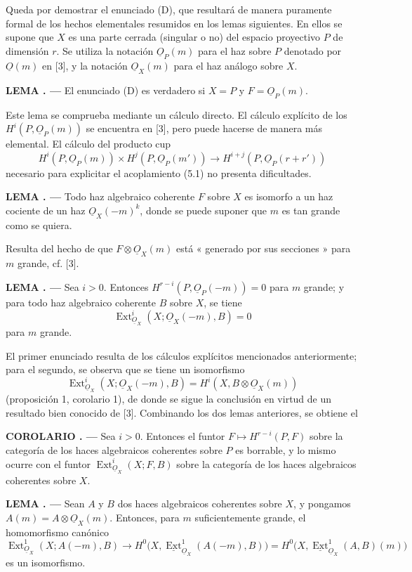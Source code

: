 \documentclass[11pt,twoside,openany]{book}
\numberwithin{equation}{section}
\newcommand{\src}[1]{%
  \phantomsection\hypertarget{src:#1}{}%
  \marginpar{\raggedleft\footnotesize\sffamily #1}%
}
\newcommand{\Osh}{\underline{O}}
\newcommand{\Extsh}{\underline{\operatorname{Ext}}}
\theoremstyle{plain}
\theoremstyle{definition}
\theoremstyle{remark}
\newcommand{\result}[2]{%
  \par\medskip\noindent\textbf{#1%
  \if\relax\detokenize{#2}\relax\else\space#2\fi. ---}\enspace
}
\newcommand{\FgaUnitKey}{frontmatter}
\renewcommand{\src}[1]{%
  \phantomsection\hypertarget{src:\FgaUnitKey:#1}{}%
  \marginpar{\raggedleft\footnotesize\sffamily #1}%
}
\theoremstyle{plain}
\theoremstyle{definition}
\theoremstyle{remark}
\begin{document}
Queda por demostrar el enunciado (D), que resultará de manera puramente formal de los hechos
elementales resumidos en los lemas siguientes. En ellos se supone que $X$ es una
parte cerrada (singular o no) del espacio proyectivo $P$ de dimensión $r$.
Se utiliza la notación $\Osh_P(m)$ para el haz sobre $P$ denotado por $\Osh(m)$ en
[3], y la notación $\Osh_X(m)$ para el haz análogo sobre $X$.

\result{LEMA}{2} El enunciado (D) es verdadero si $X=P$ y $F=\Osh_P(m)$.

Este lema se comprueba mediante un cálculo directo. El cálculo explícito de los
$H^{i}(P,\Osh_P(m))$ se encuentra en [3], pero puede hacerse de manera más
elemental. El cálculo del producto cup
\[
  H^{i}(P,\Osh_P(m))\times H^{j}(P,\Osh_P(m'))
  \longrightarrow H^{i+j}(P,\Osh_P(r+r'))
\]
necesario para explicitar el acoplamiento (5.1) no presenta dificultades.

\result{LEMA}{3} Todo haz algebraico coherente $F$ sobre $X$ es isomorfo a
un haz cociente de un haz $\Osh_X(-m)^{k}$, donde se puede suponer que $m$ es
tan grande como se quiera.

Resulta del hecho de que $F\otimes\Osh_X(m)$ está « generado por sus secciones » para
$m$ grande, cf. [3].

\result{LEMA}{4} Sea $i>0$. Entonces
$H^{r-i}(P,\Osh_P(-m))=0$ para $m$ grande; y para todo haz algebraico
coherente $B$ sobre $X$, se tiene
\[
  \operatorname{Ext}_{\Osh_X}^{i}(X;\Osh_X(-m),B)=0
\]
para $m$ grande.

El primer enunciado resulta de los cálculos explícitos mencionados anteriormente; para el
segundo, se observa que se tiene un isomorfismo
\[
  \operatorname{Ext}_{\Osh_X}^{i}(X;\Osh_X(-m),B)
  =H^{i}(X,B\otimes\Osh_X(m))
\]
(proposición 1, corolario 1), de donde se sigue la conclusión en virtud de un resultado bien
conocido de [3]. Combinando los dos lemas anteriores, se obtiene el

\result{COROLARIO}{} Sea $i>0$. Entonces el funtor
$F\longmapsto H^{r-i}(P,F)$ sobre la categoría de los haces algebraicos coherentes
sobre $P$ es borrable, y lo mismo ocurre con el funtor
$\operatorname{Ext}_{\Osh_X}^{i}(X;F,B)$ sobre la categoría de los haces
algebraicos coherentes sobre $X$.

\src{184}
\result{LEMA}{5} Sean $A$ y $B$ dos haces algebraicos coherentes sobre
$X$, y pongamos $A(m)=A\otimes\Osh_X(m)$. Entonces, para $m$ suficientemente grande,
el homomorfismo canónico
\[
  \operatorname{Ext}_{\Osh_X}^{1}(X;A(-m),B)
  \longrightarrow H^{0}\bigl(X,\Extsh_{\Osh_X}^{1}(A(-m),B)\bigr)
  =H^{0}\bigl(X,\Extsh_{\Osh_X}^{1}(A,B)(m)\bigr)
\]
es un isomorfismo.
\end{document}
